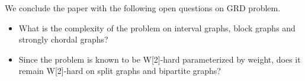 \documentclass[preprint,12pt]{elsarticle}
\begin{document}
\noindent
We conclude the paper with the following open questions on GRD problem. 
\begin{itemize}
    \item What is the complexity of the problem on interval graphs, block graphs and strongly chordal graphs?
    \item Since the problem is known to be W[2]-hard parameterized by weight, does it remain W[2]-hard on split graphs and bipartite graphs?
\end{itemize}





\end{document}
